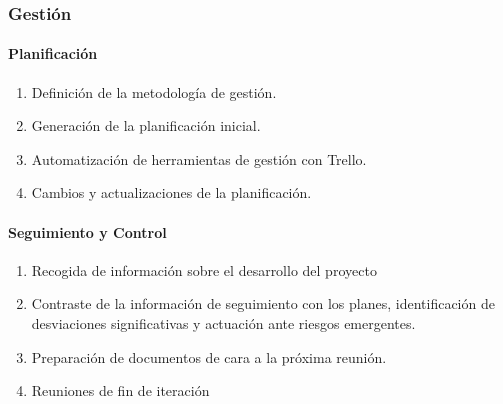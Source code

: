 \subsubsection{Gestión}
\paragraph{Planificación}
\begin{enumerate}
    \item Definición de la metodología de gestión.
    \item Generación de la planificación inicial.
    \item Automatización de herramientas de gestión con Trello.
    \item Cambios y actualizaciones de la planificación.
\end{enumerate}
\paragraph{Seguimiento y Control}
\begin{enumerate}
    \item Recogida de información sobre el desarrollo del proyecto
    \item Contraste de la información de seguimiento con los planes, identificación de desviaciones significativas y actuación ante riesgos emergentes.
    \item Preparación de documentos de cara a la próxima reunión.
    \item Reuniones de fin de iteración
\end{enumerate}

